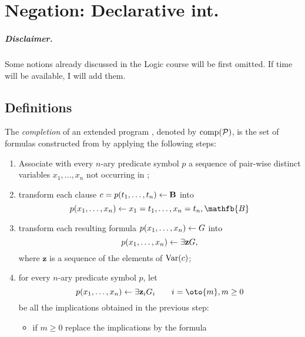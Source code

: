 \chapter{Negation: Declarative int.}

\paragraph{Disclaimer.} Some notions already discussed in the Logic course will be first omitted. If time will be available, I will add them.

\section{Definitions}

\begin{dfn}[Completion]
    The \emph{completion} of an extended program \prog, denoted by \(\operatorname{comp}(\mathcal{P})\), is the set of formulas constructed from \prog by applying the following steps:
    \begin{enumerate}
        \item Associate with every \(n\)-ary predicate symbol \(p\) a sequence of pair-wise distinct variables \(x_1,\dotsc,x_n\) not occurring in \prog;
        \item transform each clause \(c = p(t_1,\dotsc,t_n) \leftarrow \mathbf{B}\) into
        \begin{equation*}
            p(x_1,\dotsc,x_n) \from
            x_1 = t_1,\dotsc,x_n = t_n, \mathfb{B}
        \end{equation*}
        \item transform each resulting formula \(p(x_1,\dotsc,x_n) \leftarrow G\) into
        \begin{equation*}
            p(x_1,\dotsc,x_n) \leftarrow \exists{\mathbf{z}} G,
        \end{equation*}
        where \(\mathbf{z}\) is a sequence of the elements of \(\operatorname{Var}(c)\);
        \item for every \(n\)-ary predicate symbol \(p\), let
        \begin{equation*}
            p(x_1,\dotsc,x_n) \from \exists{\mathbf{z}_i} G_i \qquad i = \oto{m}, m \ge 0
        \end{equation*}
        be all the implications obtained in the previous step:
        \begin{itemize}
            \item if \(m \ge 0\) replace the implications by the formula
            \begin{equation*}

\end{equation*}
\end{itemize}
\end{enumerate}
\end{dfn}
